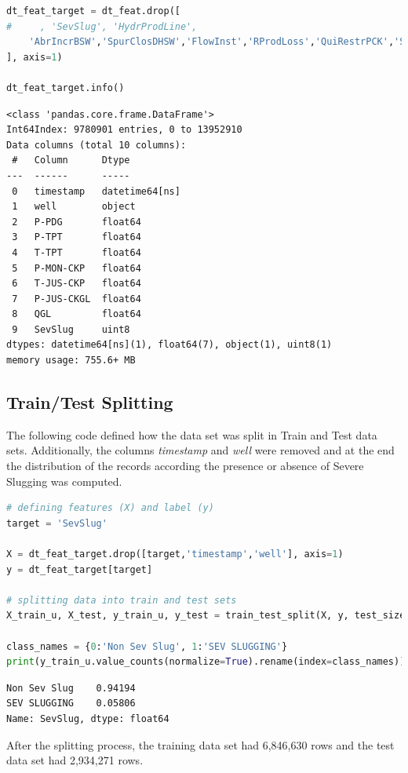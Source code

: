 \documentclass{article}
\begin{document}
\begin{lstlisting}[language=Python]
dt_feat_target = dt_feat.drop([
#     , 'SevSlug', 'HydrProdLine',
    'AbrIncrBSW','SpurClosDHSW','FlowInst','RProdLoss','QuiRestrPCK','ScalingPCK'
], axis=1)

dt_feat_target.info()
\end{lstlisting}
\begin{verbatim}
<class 'pandas.core.frame.DataFrame'>
Int64Index: 9780901 entries, 0 to 13952910
Data columns (total 10 columns):
 #   Column      Dtype         
---  ------      -----         
 0   timestamp   datetime64[ns]
 1   well        object        
 2   P-PDG       float64       
 3   P-TPT       float64       
 4   T-TPT       float64       
 5   P-MON-CKP   float64       
 6   T-JUS-CKP   float64       
 7   P-JUS-CKGL  float64       
 8   QGL         float64       
 9   SevSlug     uint8         
dtypes: datetime64[ns](1), float64(7), object(1), uint8(1)
memory usage: 755.6+ MB
\end{verbatim}

\subsection{Train/Test Splitting}

The following code defined how the data set was split in Train and Test data sets. Additionally, the columns \emph{timestamp} and \emph{well} were removed and at the end the  distribution of the records according the presence or absence of Severe Slugging was computed.

\begin{lstlisting}[language=Python]
# defining features (X) and label (y)
target = 'SevSlug'

X = dt_feat_target.drop([target,'timestamp','well'], axis=1)
y = dt_feat_target[target]

# splitting data into train and test sets
X_train_u, X_test, y_train_u, y_test = train_test_split(X, y, test_size=0.3, random_state=42)

class_names = {0:'Non Sev Slug', 1:'SEV SLUGGING'}
print(y_train_u.value_counts(normalize=True).rename(index=class_names))
\end{lstlisting}
\begin{verbatim}
Non Sev Slug    0.94194
SEV SLUGGING    0.05806
Name: SevSlug, dtype: float64
\end{verbatim}

After the splitting process, the training data set had 6,846,630 rows and the test data set had 2,934,271 rows.
\end{document}
